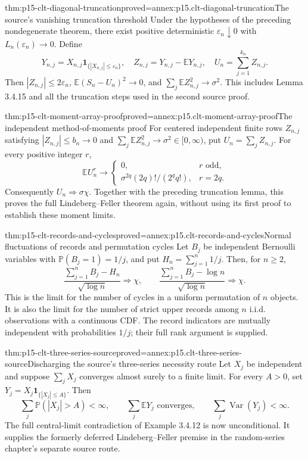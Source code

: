 \begin{hblemma}{thm:p15-clt-diagonal-truncation}{proved=annex:p15.clt-diagonal-truncation}{The source's vanishing truncation threshold}
Under the hypotheses of the preceding nondegenerate theorem, there
exist positive deterministic \(\varepsilon_n\downarrow0\) with
\(L_n(\varepsilon_n)\to0\). Define
\[
 Y_{n,j}=X_{n,j}\mathbf1_{\{|X_{n,j}|\leq\varepsilon_n\}},
 \quad Z_{n,j}=Y_{n,j}-\mathbb EY_{n,j},\quad
 U_n=\sum_{j=1}^{k_n}Z_{n,j}.
 \]
Then \(|Z_{n,j}|\leq2\varepsilon_n\),
\(\mathbb E(S_n-U_n)^2\to0\), and
\(\sum_j\mathbb EZ_{n,j}^2\to\sigma^2\).
This includes Lemma 3.4.15 and all the truncation steps used
in the second source proof.
\end{hblemma}

\begin{hbtheorem}{thm:p15-clt-moment-array-proof}{proved=annex:p15.clt-moment-array-proof}{The independent method-of-moments proof}
For centered independent finite rows \(Z_{n,j}\) satisfying
\(|Z_{n,j}|\leq b_n\to0\) and
\(\sum_j\mathbb EZ_{n,j}^2\to\sigma^2\in[0,\infty)\), put
\(U_n=\sum_jZ_{n,j}\). For every positive integer \(r\),
\[
 \mathbb EU_n^r\longrightarrow
 \begin{cases}
 0,&r\text{ odd},\\
 \sigma^{2q}(2q)!/(2^qq!),&r=2q.
 \end{cases}
 \]
Consequently \(U_n\Rightarrow\sigma\chi\).
Together with the preceding truncation lemma, this proves the
full Lindeberg--Feller theorem again, without using its first proof
to establish these moment limits.
\end{hbtheorem}

\begin{hbtheorem}{thm:p15-clt-records-and-cycles}{proved=annex:p15.clt-records-and-cycles}{Normal fluctuations of records and permutation cycles}
Let \(B_j\) be independent Bernoulli variables with
\(\mathbb P(B_j=1)=1/j\), and put \(H_n=\sum_{j=1}^n1/j\).
Then, for \(n\geq2\),
\[
 \frac{\sum_{j=1}^nB_j-H_n}{\sqrt{\log n}}\Rightarrow\chi,
 \qquad
 \frac{\sum_{j=1}^nB_j-\log n}{\sqrt{\log n}}\Rightarrow\chi.
 \]
This is the limit for the number of cycles in a uniform permutation
of \(n\) objects. It is also the limit for the number of strict upper
records among \(n\) i.i.d. observations with a continuous CDF.
The record indicators are mutually independent with probabilities
\(1/j\); their full rank argument is supplied.
\end{hbtheorem}

\begin{hbtheorem}{thm:p15-clt-three-series-source}{proved=annex:p15.clt-three-series-source}{Discharging the source's three-series necessity route}
Let \(X_j\) be independent and suppose \(\sum_jX_j\) converges
almost surely to a finite limit. For every \(A>0\), set
\(Y_j=X_j\mathbf1_{\{|X_j|\leq A\}}\). Then
\[
 \sum_j\mathbb P(|X_j|>A)<\infty,\qquad
 \sum_j\mathbb EY_j\text{ converges},\qquad
 \sum_j\operatorname{Var}(Y_j)<\infty.
 \]
The full central-limit contradiction of Example 3.4.12 is now
unconditional. It supplies the formerly deferred Lindeberg--Feller
premise in the random-series chapter's separate source route.
\end{hbtheorem}

